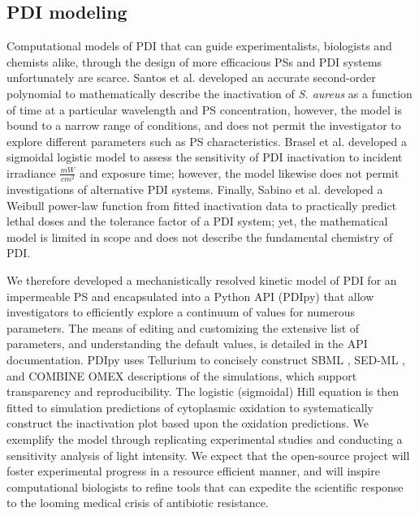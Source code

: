 \subsection{PDI modeling}
Computational models of PDI that can guide experimentalists, biologists and chemists alike, through the design of more efficacious PSs and PDI systems unfortunately are scarce. Santos et al. \cite{Santos2020ApplicationAureus} developed an accurate second-order polynomial to mathematically describe the inactivation of \textit{S. aureus} as a function of time at a particular wavelength and PS concentration, however, the model is bound to a narrow range of conditions, and does not permit the investigator to explore different parameters such as PS characteristics. Brasel et al. \cite{Brasel2020AnAgalactiae} developed a sigmoidal logistic model to assess the sensitivity of PDI inactivation to incident irradiance $\frac{mW}{cm^2}$ and exposure time; however, the model likewise does not permit investigations of alternative PDI systems. Finally, Sabino et al. \cite{Sabino2019InactivationTherapy} developed a Weibull power-law function from fitted inactivation data to practically predict lethal doses and the tolerance factor of a PDI system; yet, the mathematical model is limited in scope and does not describe the fundamental chemistry of PDI. 

We therefore developed a mechanistically resolved kinetic model of PDI for an impermeable PS and encapsulated into a Python API (PDIpy) that allow investigators to efficiently explore a continuum of values for numerous parameters. The means of editing and customizing the extensive list of parameters, and understanding the default values, is detailed in the API documentation. PDIpy uses Tellurium \cite{Choi2018Tellurium:Biology} to concisely construct SBML \cite{Keating2020Models}, SED-ML \cite{Waltemath2011ReproducibleLanguage}, and COMBINE OMEX \cite{Bergmann2014COMBINEProject} descriptions of the simulations, which support transparency and reproducibility. The logistic (sigmoidal) Hill equation is then fitted to simulation predictions of cytoplasmic oxidation to systematically construct the inactivation plot based upon the oxidation predictions. We exemplify the model through replicating experimental studies and conducting a sensitivity analysis of light intensity. We expect that the open-source project will foster experimental progress in a resource efficient manner, and will inspire computational biologists to refine tools that can expedite the scientific response to the looming medical crisis of antibiotic resistance. 

